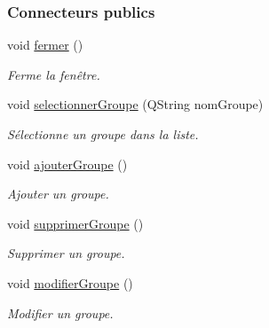 \subsubsection*{Connecteurs publics}
\begin{DoxyCompactItemize}
\item 
void \hyperlink{class_ihm_gestion_groupe_af45013ab7614dbe037025efd6884907f}{fermer} ()
\begin{DoxyCompactList}\small\item\em Ferme la fenêtre. \end{DoxyCompactList}\item 
void \hyperlink{class_ihm_gestion_groupe_a322f2c8584ae8e5be7f2075b73905beb}{selectionner\+Groupe} (Q\+String nom\+Groupe)
\begin{DoxyCompactList}\small\item\em Sélectionne un groupe dans la liste. \end{DoxyCompactList}\item 
void \hyperlink{class_ihm_gestion_groupe_a5e5b11cb395970f64b30427ccb2ecf4d}{ajouter\+Groupe} ()
\begin{DoxyCompactList}\small\item\em Ajouter un groupe. \end{DoxyCompactList}\item 
void \hyperlink{class_ihm_gestion_groupe_a08bdd132a37ac574b15d00e4dc959d7f}{supprimer\+Groupe} ()
\begin{DoxyCompactList}\small\item\em Supprimer un groupe. \end{DoxyCompactList}\item 
void \hyperlink{class_ihm_gestion_groupe_a810c186bf38dab776c7167c85671b268}{modifier\+Groupe} ()
\begin{DoxyCompactList}\small\item\em Modifier un groupe. \end{DoxyCompactList}\end{DoxyCompactItemize}
